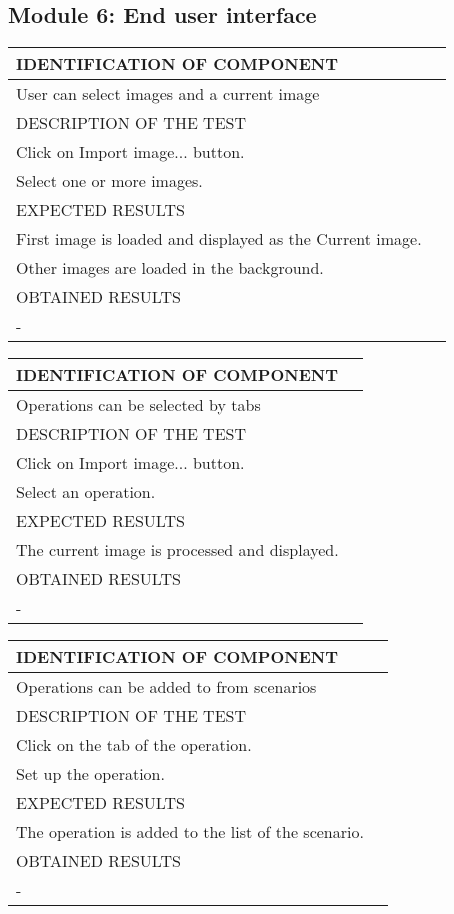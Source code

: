 \documentclass{polytech/polytech}
\numberwithin{figure}{chapter}
\begin{document}
\begin{appendix}
\subsection{Module 6: End user interface}

\begin{table}[]
\begin{tabular}{|l|l|}\hline
\color{C} IDENTIFICATION OF COMPONENT \\\hline
User can select images and a current image  \\\hline
\color{C} DESCRIPTION OF THE TEST\\\hline
Click on Import image... button.\\ Select one or more images. \\\hline
\color{C} EXPECTED RESULTS \\\hline
First image is loaded and displayed as the Current image.\\ Other images are loaded in the background. \\\hline
\color{C} OBTAINED RESULTS \\\hline
- \\\hline
\end{tabular}
\end{table}

\begin{table}[]
\begin{tabular}{|l|l|}\hline
\color{C} IDENTIFICATION OF COMPONENT \\\hline
Operations can be selected by tabs  \\\hline
\color{C} DESCRIPTION OF THE TEST\\\hline
Click on Import image... button.\\ Select an operation. \\\hline
\color{C} EXPECTED RESULTS \\\hline
The current image is processed and displayed. \\\hline
\color{C} OBTAINED RESULTS \\\hline
- \\\hline
\end{tabular}
\end{table}

\begin{table}[]
\begin{tabular}{|l|l|}\hline
\color{C} IDENTIFICATION OF COMPONENT \\\hline
Operations can be added to from scenarios  \\\hline
\color{C} DESCRIPTION OF THE TEST\\\hline
Click on the tab of the operation.\\ Set up the operation. \\\hline
\color{C} EXPECTED RESULTS \\\hline
The operation is added to the list of the scenario. \\\hline
\color{C} OBTAINED RESULTS \\\hline
- \\\hline
\end{tabular}
\end{table}


\end{appendix}
\end{document}
